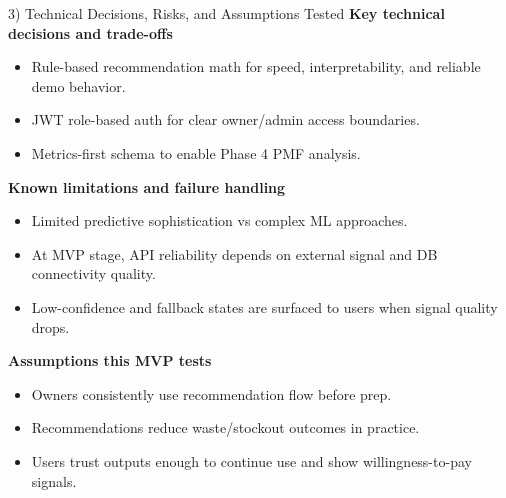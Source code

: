 \documentclass[aspectratio=169]{beamer}
\begin{document}
\begin{frame}{3) Technical Decisions, Risks, and Assumptions Tested}
\textbf{Key technical decisions and trade-offs}
\begin{itemize}
  \item Rule-based recommendation math for speed, interpretability, and reliable demo behavior.
  \item JWT role-based auth for clear owner/admin access boundaries.
  \item Metrics-first schema to enable Phase 4 PMF analysis.
\end{itemize}

\textbf{Known limitations and failure handling}
\begin{itemize}
  \item Limited predictive sophistication vs complex ML approaches.
  \item At MVP stage, API reliability depends on external signal and DB connectivity quality.
  \item Low-confidence and fallback states are surfaced to users when signal quality drops.
\end{itemize}

\textbf{Assumptions this MVP tests}
\begin{itemize}
  \item Owners consistently use recommendation flow before prep.
  \item Recommendations reduce waste/stockout outcomes in practice.
  \item Users trust outputs enough to continue use and show willingness-to-pay signals.
\end{itemize}
\end{frame}
\end{document}
